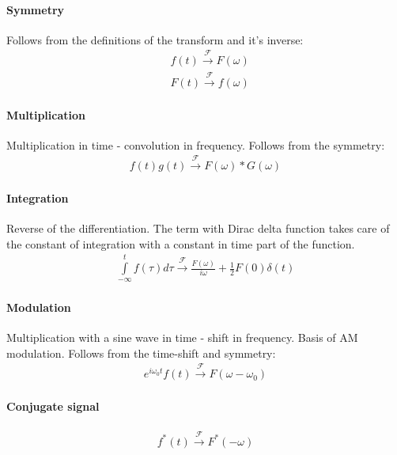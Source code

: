 \documentclass{article}
\begin{document}
\paragraph{Symmetry} Follows from the definitions of the transform and it's inverse:
\begin{align*}
    &f(t) \xrightarrow{\mathcal{F}} F(\omega) \\
    &F(t) \xrightarrow{\mathcal{F}} f(\omega)
\end{align*}

\paragraph{Multiplication} Multiplication in time - convolution in frequency. Follows from the symmetry:
\begin{align*}
    f(t)g(t) \xrightarrow{\mathcal{F}} F(\omega) * G(\omega)
\end{align*}

\paragraph{Integration} Reverse of the differentiation. 
The term with Dirac delta function takes care of the constant of integration with a constant in time part of the function.
\begin{align*}
    \int \limits^{t}_{-\infty}f(\tau)d \tau \xrightarrow{\mathcal{F}} \frac{F(\omega)}{i \omega} + \frac{1}{2}F(0)\delta(t)
\end{align*}

\paragraph{Modulation} Multiplication with a sine wave in time - shift in frequency. Basis of AM modulation.
Follows from the time-shift and symmetry:
\begin{align*}
    e^{i \omega_0 t}f(t) \xrightarrow{\mathcal{F}} F(\omega - \omega_0)
\end{align*}

\paragraph{Conjugate signal}
\begin{align*}
   f^*(t) \xrightarrow{\mathcal{F}} F^{*}(-\omega)
\end{align*}
\end{document}
